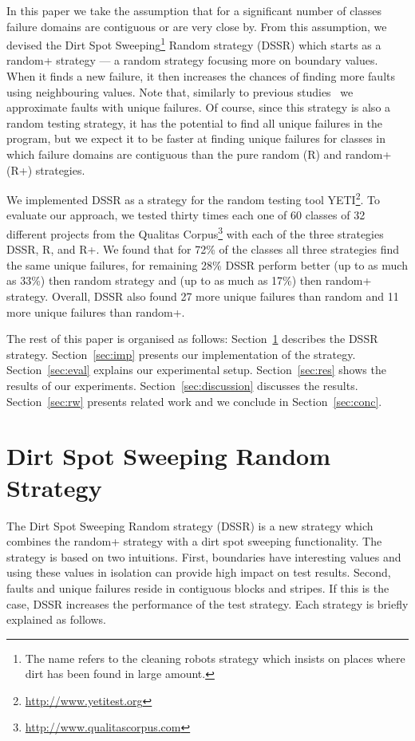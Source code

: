 \documentclass{acm_proc_article-sp}
\begin{document}
In this paper we take the assumption that for a significant number of classes failure domains are contiguous or are very close by. From this assumption, we devised the Dirt Spot Sweeping\footnote{The name refers to the cleaning robots strategy which insists on places where dirt has been found in large amount.} Random strategy (DSSR) which starts as a random+ strategy --- a random strategy focusing more on boundary values. When it finds a new failure, it then increases the chances of finding more faults using neighbouring values. Note that, similarly to previous studies~\cite{Oriol2012} we approximate faults with unique failures. Of course, since this strategy is also a random testing strategy, it has the potential to find all unique failures in the program, but we expect it to be faster at finding unique failures for classes in which failure domains are contiguous than the pure random (R) and random+ (R+) strategies.

We implemented DSSR as a strategy for the random testing tool YETI\footnote{\url{http://www.yetitest.org}}. To evaluate our approach, we tested thirty times each one of 60 classes of 32 different projects from the Qualitas Corpus\footnote{\url{http://www.qualitascorpus.com}} with each of the three strategies DSSR, R, and R+. We found that for 72\% of the classes all three strategies find the same unique failures, for remaining 28\% DSSR perform better (up to as much as 33\%) then random strategy and (up to as much as 17\%) then random+ strategy.
Overall, DSSR also found 27 more unique failures than random and 11 more unique failures than random+.


The rest of this paper is organised as follows:
Section~\ref{sec:dssr} describes the DSSR strategy. Section~\ref{sec:imp} presents our implementation of the strategy. Section~\ref{sec:eval} explains our experimental setup. Section~\ref{sec:res} shows the results of our experiments. Section~\ref{sec:discussion} discusses the results. Section~\ref{sec:rw} presents related work and we conclude in Section~\ref{sec:conc}.





\section{Dirt Spot Sweeping Random \\ Strategy}\label{sec:dssr}
The Dirt Spot Sweeping Random strategy (DSSR) is a new strategy which combines the random+ strategy with a dirt spot sweeping functionality. The strategy is based on two intuitions. First, boundaries have interesting values and using these values in isolation can provide high impact on test results. Second, faults and unique failures reside in contiguous blocks and stripes. If this is the case, DSSR increases the performance of the test strategy. Each strategy is briefly explained as follows.
\end{document}

